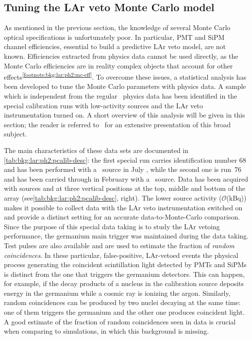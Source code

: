 \subsection{Tuning the LAr veto Monte Carlo model}%
\label{sec:bkg:lar:ph2:pcalib}

As mentioned in the previous section, the knowledge of several Monte Carlo optical
specifications is unfortunately poor. In particular, PMT and SiPM channel efficiencies,
essential to build a predictive LAr veto model, are not known. Efficiencies extracted from
physics data cannot be used directly, as the Monte Carlo efficiencies are in reality
complex objects that account for other
effects\textsuperscript{\ref{footnote:bkg:lar:ph2:mc-eff}}. To overcome these issues, a
statistical analysis has been developed to tune the Monte Carlo parameters with physics
data. A sample which is independent from the regular \gerda\ physics data has been
identified in the special calibration runs with low-activity sources and the LAr veto
instrumentation turned on. A short overview of this analysis will be given in this
section; the reader is referred to~\cite{Wiesinger2021} for an extensive presentation of
this broad subject.

The main characteristics of these data sets are documented in
\cref{tab:bkg:lar:ph2:pcalib-desc}: the first special run carries identification number
68 and has been performed with a \Th\ source in July , while the second one
is run~76 and has been carried through in February  with a \Ra\ source. Data has been
acquired with sources  and  at three vertical positions at the top, middle and
bottom of the array (see\cref{tab:bkg:lar:ph2:pcalib-desc}, right). The lower source
activity ($\mathcal{O}$(kBq)) makes it possible to collect data with the LAr veto
instrumentation switched on and provide a distinct setting for an accurate
data-to-Monte-Carlo comparison. Since the purpose of this special data taking is to study
the LAr vetoing performance, the germanium main trigger was maintained during the
data taking. Test pulses are also available and are used to estimate the fraction of
\emph{random coincidences}. In these particular, false-positive, LAr-vetoed events the
physical process generating the coincident scintillation light detected by PMTs and SiPMs
is distinct from the one that triggers the germanium detectors. This can happen, for
example, if the decay products of a nucleus in the calibration source deposits energy in
the germanium while a cosmic ray is ionizing the argon. Similarly, random coincidences can
be produced by two nuclei decaying at the same time: one of them triggers the germanium
and the other one produces coincident light. A good estimate of the fraction of random
coincidences seen in data is crucial when comparing to simulations, in which this
background is missing.

